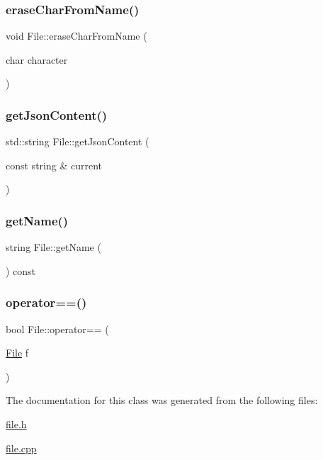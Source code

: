 \subsubsection{\texorpdfstring{erase\+Char\+From\+Name()}{eraseCharFromName()}}
{\footnotesize\ttfamily void File\+::erase\+Char\+From\+Name (\begin{DoxyParamCaption}\item[{char}]{character }\end{DoxyParamCaption})\hspace{0.3cm}{\ttfamily [inline]}}

\mbox{\label{class_file_afaee512326a13dc99d6b8d08522eabe8}} 
\subsubsection{\texorpdfstring{get\+Json\+Content()}{getJsonContent()}}
{\footnotesize\ttfamily std\+::string File\+::get\+Json\+Content (\begin{DoxyParamCaption}\item[{const string \&}]{current }\end{DoxyParamCaption})}

\mbox{\label{class_file_a4b6032847dfd076db8ed44a532387f07}} 
\subsubsection{\texorpdfstring{get\+Name()}{getName()}}
{\footnotesize\ttfamily string File\+::get\+Name (\begin{DoxyParamCaption}{ }\end{DoxyParamCaption}) const\hspace{0.3cm}{\ttfamily [inline]}}

\mbox{\label{class_file_aadbe64432e7e403f546ff35a3bfa8d97}} 
\subsubsection{\texorpdfstring{operator==()}{operator==()}}
{\footnotesize\ttfamily bool File\+::operator== (\begin{DoxyParamCaption}\item[{\hyperlink{class_file}{File}}]{f }\end{DoxyParamCaption})\hspace{0.3cm}{\ttfamily [inline]}}



The documentation for this class was generated from the following files\+:\begin{DoxyCompactItemize}
\item 
\hyperlink{file_8h}{file.\+h}\item 
\hyperlink{file_8cpp}{file.\+cpp}\end{DoxyCompactItemize}
